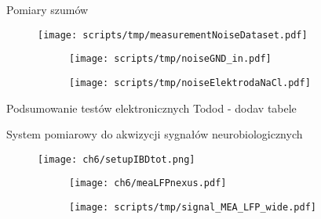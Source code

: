\begin{frame}{Pomiary szumów}
    \begin{figure}[H]
        \centering 
        \texttt{[image: scripts/tmp/measurementNoiseDataset.pdf]}  
    \end{figure}

    \begin{figure}[H]
        \centering
        \begin{subfigure}[b]{0.485\textwidth}
            \centering
            \texttt{[image: scripts/tmp/noiseGND\_in.pdf]}
            \caption{}
            \label{fig:noiseGND_in}
        \end{subfigure}
        \begin{subfigure}[b]{0.485\textwidth}
            \centering
            \texttt{[image: scripts/tmp/noiseElektrodaNaCl.pdf]}
            \caption{}
            \label{fig:noiseElektrodaNaCl}
        \end{subfigure}     
    \end{figure}
\end{frame}

\begin{frame}{Podsumowanie testów elektronicznych}
    Todod - dodav tabele
\end{frame}

\begin{frame}{System pomiarowy do akwizycji sygnałów neurobiologicznych}
    \begin{figure}[H]
        \centering 
        \texttt{[image: ch6/setupIBDtot.png]}  
    \end{figure}
\end{frame}

\begin{frame}{}
    \begin{figure}[H]
        \centering
   
   
       \begin{subfigure}{0.25\textwidth}
           \centering
           \texttt{[image: ch6/meaLFPnexus.pdf]}
        \end{subfigure}
           \hspace{-6em}
        \begin{subfigure}{0.7\textwidth}
           \centering
           \texttt{[image: scripts/tmp/signal\_MEA\_LFP\_wide.pdf]}
        \end{subfigure}
   \end{figure}
\end{frame}

